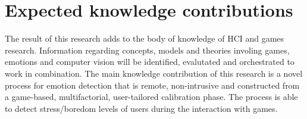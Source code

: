


\section{Expected knowledge contributions}
\label{sec:contributions}

The result of this research adds to the body of knowledge of HCI and games research. Information regarding concepts, models and theories involing games, emotions and computer vision will be identified, evalutated and orchestrated to work in combination. The main knowledge contribution of this research is a novel process for emotion detection that is remote, non-intrusive and constructed from a game-based, multifactorial, user-tailored calibration phase. The process is able to detect stress/boredom levels of users during the interaction with games.

